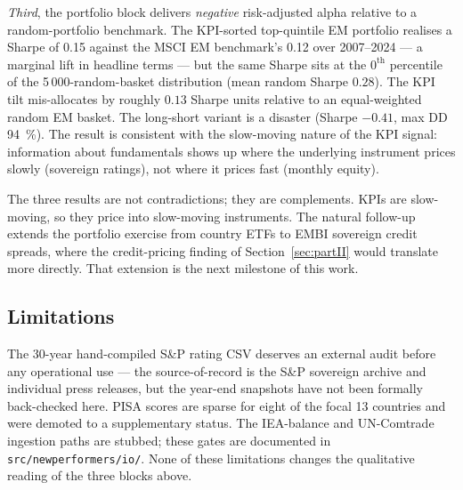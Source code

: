 \emph{Third}, the portfolio block delivers \emph{negative} risk-adjusted alpha relative to a random-portfolio benchmark. The KPI-sorted top-quintile EM portfolio realises a Sharpe of 0.15 against the MSCI EM benchmark's 0.12 over 2007--2024 --- a marginal lift in headline terms --- but the same Sharpe sits at the $0^{\text{th}}$ percentile of the 5\,000-random-basket distribution (mean random Sharpe $0.28$). The KPI tilt mis-allocates by roughly $0.13$ Sharpe units relative to an equal-weighted random EM basket. The long-short variant is a disaster (Sharpe $-0.41$, max DD 94~\%). The result is consistent with the slow-moving nature of the KPI signal: information about fundamentals shows up where the underlying instrument prices slowly (sovereign ratings), not where it prices fast (monthly equity).

The three results are not contradictions; they are complements. KPIs are slow-moving, so they price into slow-moving instruments. The natural follow-up extends the portfolio exercise from country ETFs to EMBI sovereign credit spreads, where the credit-pricing finding of Section~\ref{sec:partII} would translate more directly. That extension is the next milestone of this work.

\subsection*{Limitations}

The 30-year hand-compiled S\&P rating CSV deserves an external audit before any operational use --- the source-of-record is the S\&P sovereign archive and individual press releases, but the year-end snapshots have not been formally back-checked here. PISA scores are sparse for eight of the focal 13 countries and were demoted to a supplementary status. The IEA-balance and UN-Comtrade ingestion paths are stubbed; these gates are documented in \texttt{src/newperformers/io/}. None of these limitations changes the qualitative reading of the three blocks above.
